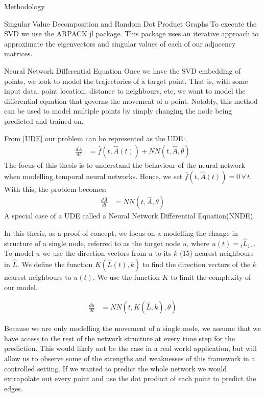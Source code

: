 \documentclass[12pt]{amsbook}
\begin{document}
\begin{chapter}{Methodology}
\begin{section}{Singular Value Decomposition and Random Dot Product Graphs}
        To execute the SVD we use the ARPACK.jl\cite{lehoucq1998arpack} package. This package uses an iterative approach to approximate the eigenvectors and singular values of each of our adjacency matrices\cite{lehoucq1996deflation}. 
    \end{section}   

    \begin{section}{Neural Network Differential Equation}
        Once we have the SVD embedding of points, we look to model the trajectories of a target point. That is, with some input data, point location, distance to neighbours, etc, we want to model the differential equation that governs the movement of a point. Notably, this method can be used to model multiple points by simply changing the node being predicted and trained on. 
            
        From \cref{UDE} our problem can be represented as the UDE:
        \begin{align}
            \frac{d \hat A}{dt} &= \hat f(t,\hat A(t)) + NN(t, \hat A, \theta)
        \end{align}
        The focus of this thesis is to understand the behaviour of the neural network when modelling temporal neural networks. Hence, we set $\hat f(t, \hat A(t))=0 \, \forall \, t$. With this, the problem becomes:
        \begin{align}
            \frac{d \hat A}{dt} &= NN(t, \hat A, \theta)
        \end{align}
        A special case of a UDE called a Neural Network Differential Equation(NNDE).

        In this thesis, as a proof of concept, we focus on a modelling the change in structure of a single node, referred to as the target node $u$, where $u(t)={_t}\hat L_{1\cdot}$. To model $u$ we use the direction vectors from $u$ to its $k$ (15) nearest neighbours in $\hat L$. We define the function $K(\hat L(t), k)$ to find the direction vectors of the $k$ nearest neighbours to $u(t)$. We use the function $K$ to limit the complexity of our model.

        \begin{align}
            \frac{du}{dt} &= NN(t, K(\hat L, k), \theta)
        \end{align}

        Because we are only modelling the movement of a single node, we assume that we have access to the rest of the network structure at every time step for the prediction. This would likely not be the case in a real world application, but will allow us to observe some of the strengths and weaknesses of this framework in a controlled setting. If we wanted to predict the whole network we would extrapolate out every point and use the dot product of each point to predict the edges.
        

\end{section}
\end{chapter}
\end{document}
